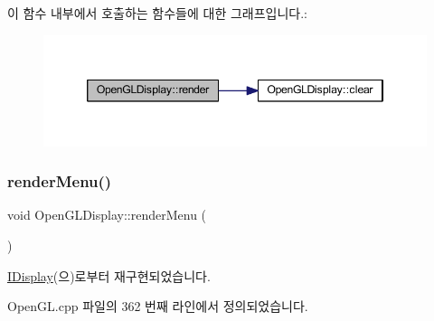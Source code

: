 이 함수 내부에서 호출하는 함수들에 대한 그래프입니다.\+:
\nopagebreak
\begin{figure}[H]
\begin{center}
\leavevmode
\includegraphics[width=346pt]{class_open_g_l_display_aa0ae6cc7e0a15da37e167d6f91590c49_cgraph}
\end{center}
\end{figure}
\mbox{\label{class_open_g_l_display_a55b32d45baec33ca6f800e5d847cb8f4}} 
\subsubsection{\texorpdfstring{render\+Menu()}{renderMenu()}}
{\footnotesize\ttfamily void Open\+G\+L\+Display\+::render\+Menu (\begin{DoxyParamCaption}{ }\end{DoxyParamCaption})\hspace{0.3cm}{\ttfamily [virtual]}}



\mbox{\hyperlink{class_i_display_ad6fc199a615635440ca01485c1283d41}{I\+Display}}(으)로부터 재구현되었습니다.



Open\+G\+L.\+cpp 파일의 362 번째 라인에서 정의되었습니다.


